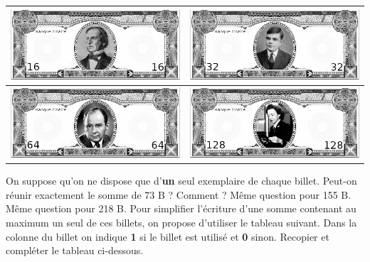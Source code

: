 \documentclass[11pt,a4paper]{article}
\begin{document}
\begin{Exercise}[title={Compter avec des 0 et des 1}]
\begin{center}
\begin{tabularx}{0.8\textwidth}{|Y|Y|}
\hline
\rule{0pt}{64px}\includegraphics[scale=1]{images/boole.eps} & \includegraphics[scale=1]{images/turing.eps} \\
\hline
\rule{0pt}{64px}\includegraphics[scale=1]{images/vonneumann.eps} & \includegraphics[scale=1]{images/hooper.eps}  \\
\hline
\end{tabularx}
\end{center}
\Question On suppose qu'on ne dispose que d'\textbf{un} seul exemplaire de chaque billet.
   \subQuestion Peut-on réunir exactement le somme de 73 {\bbfamily B}  ? Comment ?
    \subQuestion Même question pour 155 {\bbfamily B}.
  	\subQuestion Même question pour 218 {\bbfamily B}.
 \Question Pour simplifier l'écriture d'une somme contenant au maximum un seul de ces billets, on propose d'utiliser le tableau suivant. Dans la colonne du billet on indique \textbf{1} si le billet est utilisé et \textbf{0} sinon. Recopier et compléter le tableau ci-dessous.

\end{Exercise}
\end{document}
